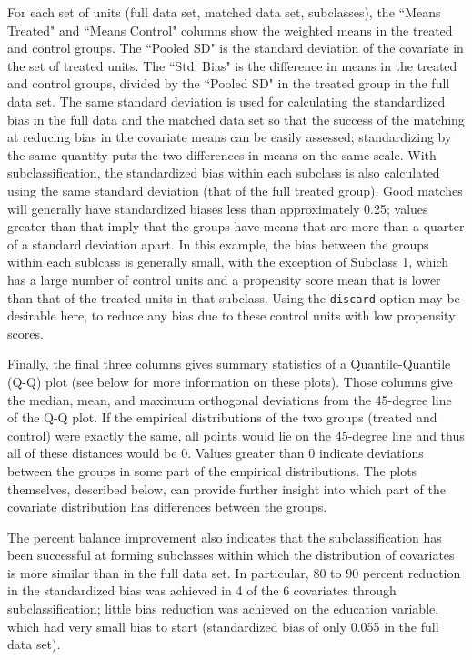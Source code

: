 \documentclass[oneside,letterpaper,titlepage]{article}
\begin{document}
\begin{enumerate}
For each set of units (full data set, matched data set, subclasses), the ``Means Treated" and ``Means Control" columns show 
the weighted
means in the treated and control groups.  The ``Pooled SD" is the standard deviation of the covariate in the set
of treated units.  The ``Std. Bias" is the difference in means in the treated and control groups, divided by the ``Pooled SD" in 
the treated group in the full data
set.  The same standard deviation is used for calculating the standardized bias in the full data and the matched data set
so that the success of the matching at reducing bias in the covariate means can be easily assessed; standardizing
by the same quantity puts the two differences in means on the same scale.  With subclassification, the standardized
bias within each subclass is also calculated using the same standard deviation (that of the full treated group).   Good 
matches will generally have standardized biases less than approximately 0.25; values greater than that imply that the
groups have means that are more than a quarter of a standard deviation apart.   In this example, the bias between the groups 
within each sublcass is generally small, with the exception of Subclass 1, which has a large number of control units and a 
propensity score mean that is lower than that of the treated units in that subclass.  Using the \texttt{discard} option may be 
desirable here, to reduce any bias due to these control units with low propensity scores.  

Finally, the final three columns 
gives summary statistics of a Quantile-Quantile (Q-Q) plot (see below for more information on these plots).
Those columns give the median, mean, and maximum orthogonal deviations from the 45-degree line of the Q-Q plot.  If the empirical distributions
of the two groups (treated and control) were exactly the same, all points would lie on the 45-degree line and thus all of these distances
would be 0.  Values greater than 0 indicate deviations between the groups in some part of the empirical distributions.  The plots themselves,
described below, can provide further insight into which part of the covariate distribution has differences between the groups.

The percent balance improvement also indicates that the subclassification has been successful at forming subclasses within 
which the distribution of covariates is more similar than in the full data set.  In particular, 80 to 90 percent reduction in 
the standardized bias was achieved in 4 of the 6 covariates through subclassification; little bias reduction was achieved on 
the education variable, which had very small bias to start (standardized bias of only 0.055 in the full data set).  


\end{enumerate}
\end{document}
